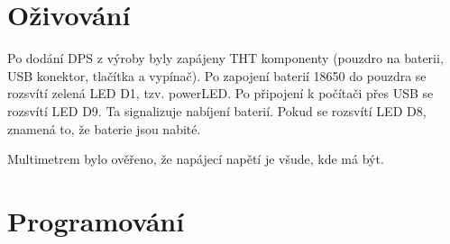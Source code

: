\chapter{Oživování}
Po dodání DPS z výroby byly zapájeny THT komponenty (pouzdro na baterii, USB konektor, tlačítka a vypínač). Po zapojení baterií 18650 do pouzdra 
se rozsvítí zelená LED D1, tzv. powerLED. Po připojení k počítači přes USB se rozsvítí LED D9. Ta signalizuje nabíjení baterií. Pokud se rozsvítí
LED D8, znamená to, že baterie jsou nabité.

Multimetrem bylo ověřeno, že napájecí napětí je všude, kde má být.

\chapter{Programování}
